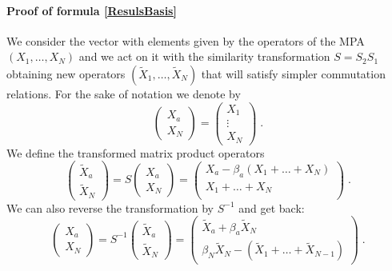 \documentclass[10pt]{article}
\numberwithin{equation}{section}
\numberwithin{equation}{subsection}
\newcommand{\Xt}{\widetilde{X}}
\newcommand{\dt}{\;.}
\begin{document}
\paragraph{Proof of formula \eqref{ResulsBasis}} 
We consider the vector with elements given by the operators of the MPA $(X_{1},\ldots,X_{N})$ and we act on it with the similarity transformation $S=S_{2}S_{1}$ obtaining new operators $(\Xt_{1},\ldots,\Xt_{N})$ that will satisfy simpler commutation relations. 
For the sake of notation we denote by
\begin{equation}
    \begin{pmatrix}
		X_{a}\\ 
		X_{N}
	\end{pmatrix}=\begin{pmatrix}
	    X_{1}\\
     \vdots\\
     X_{N}
	\end{pmatrix}\dt%
\end{equation}
We define the transformed matrix product operators
\begin{equation}\label{Xtildes2b}
	\begin{pmatrix}
		\Xt_{a}\\ 
		\Xt_{N}
	\end{pmatrix} =S\begin{pmatrix}
		X_{a}\\X_{N}
	\end{pmatrix}=\begin{pmatrix} 
		X_{a}-\beta_{a}(X_{1}+\ldots+X_{N})\\
				X_{1}+\ldots +X_{N}\\
	\end{pmatrix}\dt%
\end{equation}
We can also reverse the transformation by $S^{-1}$ and get back: 
\begin{equation}\label{Xes}
	\begin{pmatrix}
		X_{a}\\
		X_{N} 
	\end{pmatrix} =S^{-1}\begin{pmatrix}
		\widetilde{X}_{a}\\
		\widetilde{X}_{N}
	\end{pmatrix}=\begin{pmatrix}
		\Xt_{a}+\beta_{a}\Xt_{N}\\ 
		\beta_N\Xt_{N}-(\Xt_{1}+\ldots+\Xt_{N-1})
	\end{pmatrix}\dt%
\end{equation}
\end{document}
